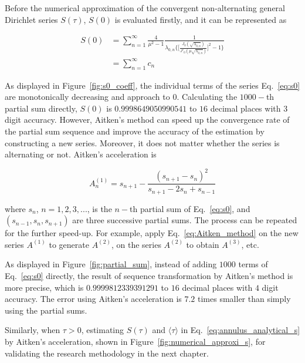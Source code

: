 Before the numerical approximation of the convergent non-alternating
general Dirichlet series \cite{hardy2013general} $S(\tau)$, $S(0)$ is
evaluated firstly, and it can be represented as

\begin{equation}\label{eq:s0}
\begin{split}
S(0) &= \sum_{n=1}^{\infty} \frac{4}{\mu^2 - 1} \frac{1}{\lambda_{0,n} \bigg\{\bigg[\frac{J_0(\sqrt{\lambda_{0,n}})}{J'_0(\mu\sqrt{\lambda_{0,n}})}\bigg]^2 -1\bigg\}}\\
&= \sum_{n=1}^{\infty} c_n
\end{split}
\end{equation}

As displayed in Figure~\ref{fig:s0_coeff}, the individual terms of the
series Eq.~\ref{eq:s0} are monotonically decreasing and approach to
$0$. Calculating the $1000-$th partial sum directly, $S(0)$ is
$0.9998649050990541$ to $16$ decimal places with $3$ digit
accuracy. However, Aitken’s method can speed up the convergence rate
of the partial sum sequence and improve the accuracy of the estimation
by constructing a new series. Moreover, it does not matter whether the
series is alternating or not. Aitken's acceleration is

\begin{equation}\label{eq:Aitken_method}
A^{(1)}_n = s_{n+1} - \frac{(s_{n+1} - s_n)^2}{s_{n+1} - 2s_n + s_{n-1}}
\end{equation}

where  $s_n$,  $n=1,  2,  3,  ...$,  is  the  $n-$th  partial  sum  of
Eq.~\ref{eq:s0}, and  $(s_{n-1}, s_n,  s_{n+1})$ are  three successive
partial  sums.   The  process   can  be   repeated  for   the  further
speed-up.  For example,  apply Eq.~\ref{eq:Aitken_method}  on the  new
series $A^{(1)}$  to generate  $A^{(2)}$, on  the series  $A^{(2)}$ to
obtain $A^{(3)}$, etc.

As displayed in Figure~\ref{fig:partial_sum}, instead of adding $1000$
terms of Eq.~\ref{eq:s0} directly, the result of sequence
transformation by Aitken's method is more precise, which is
$0.9999812339391291$ to $16$ decimal places with $4$ digit
accuracy. The error using Aitken's acceleration is $7.2$ times smaller
than simply using the partial sums.


Similarly, when $\tau > 0$, estimating $S(\tau)$ and $\langle \tau \rangle$ in
Eq.~\ref{eq:annulus_analytical_s} by Aitken's acceleration, shown in
Figure~\ref{fig:numerical_approxi_s}, for validating the research
methodology in the next chapter.



